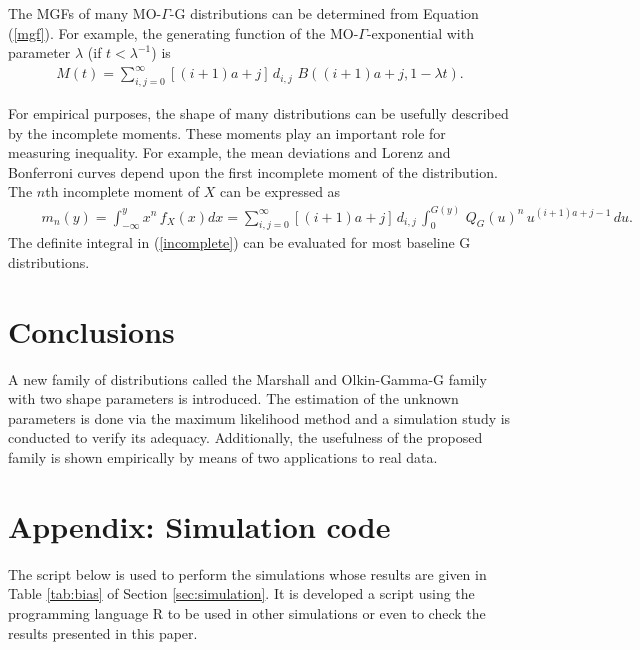 \documentclass[12pt,a4paper]{article} %
\begin{document}
The MGFs of many MO-$\Gamma$-G distributions can be determined from Equation (\ref{mgf}).
For example, the generating function of the MO-$\Gamma$-exponential with parameter $\lambda$
(if $t<\lambda^{-1}$) is
\begin{eqnarray*}
\displaystyle
M(t)=\sum_{i,j=0}^{\infty} [(i+1)a+j]\,d_{i,j}\,\,B((i+1)a+j,1-\lambda t).
\end{eqnarray*}

For empirical purposes, the shape of many distributions can be usefully described by
the incomplete moments. These moments play an important role for measuring
inequa\-lity. For example, the mean deviations and Lorenz and Bonferroni curves depend upon the first incomplete moment of the distribution.
The $n$th incomplete moment of $X$ can be expressed as
{\small
\begin{eqnarray}\label{incomplete}
\displaystyle
\qquad
m_{n}(y)=\int_{-\infty}^y x^n\,f_{X}(x) dx = \sum_{i,j=0}^{\infty} [(i+1)a+j]\,d_{i,j}\,\int_{0}^{G(y)}\,Q_G(u)^n\, u^{(i+1)a+j-1}\,du.
\end{eqnarray}
}
The definite integral in (\ref{incomplete}) can be evaluated for most baseline G distributions.



\section{Conclusions}\label{conclusions}

A new family of distributions called the Marshall and Olkin-Gamma-G family with two shape parameters is introduced. The estimation of the unknown
parameters is done via the maximum likelihood method and a simulation study is conducted to verify its adequacy. Additionally, the usefulness
of the proposed family is shown empirically by means of two applications to real data.

\appendix

\section{Appendix: Simulation code}\label{ap:simulation}

The script below is used to perform the simulations whose results are given in Table \ref{tab:bias} of Section \ref{sec:simulation}.
It is developed a script using the programming language {\sf R} to be used in other simulations or even to check the results presented in this paper.



\end{document}
